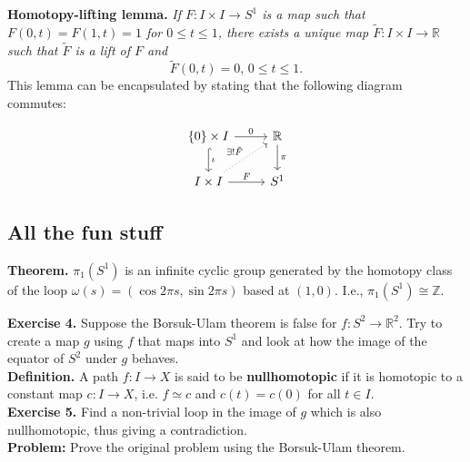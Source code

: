 \documentclass[a4paper]{article}
\theoremstyle{plain}%
\theoremstyle{definition}
\theoremstyle{remark}
\begin{document}
\textbf{Homotopy-lifting lemma.}
    \textit{If $F  \colon I \times I \to S^{1}$ is a map such that
    $F(0,t) = F(1,t) = 1$ for $0 \le t \le 1$, there exists a unique
    map $\tilde{F}  \colon I \times I \to \mathbb{R}$ such that
    $\tilde{F}$ is a lift of $F$ and
    \[
    \tilde{F}(0,t) = 0, \, 0 \le t \le 1.
    \] 
}
This lemma can be encapsulated by stating that the following diagram commutes:

\begin{equation*}
\begin{tikzcd}
    \left\{ 0 \right\} \times I \ar[r, "0"] \ar[d, "\iota", hookrightarrow]
    & \mathbb{R} \ar[d, "\pi"]\\
    I \times I \ar[ru, " \exists ! \tilde{F}", dotted] \ar[r, "F"] & S^{1}
\end{tikzcd}
\end{equation*}




\subsection*{All the fun stuff}

\textbf{Theorem.} $\pi_1 (S^{1})$ is an infinite cyclic group generated by the
homotopy class of the loop $\omega (s) = \left( \cos 2 \pi s, \sin 2 \pi
s \right) $ based at $(1,0)$. I.e., $\pi_1 (S^{1}) \cong \mathbb{Z}$.\\
\linebreak





\textbf{Exercise 4.} 
Suppose the Borsuk-Ulam theorem is false for $f  \colon S^2 \to \mathbb{R}^2$.
Try to create a map $g$ using $f$ that maps into $S^{1}$ and look at how the image
of the equator of $S^2$ under $g$ behaves.\\
    \linebreak
    \textbf{Definition.} A path $f  \colon I \to X$ is said to be
    \textbf{nullhomotopic} if it is homotopic to a constant map
    $c  \colon I \to X$, i.e. $f \simeq c$ and $c(t) = c(0)$ for all $t \in
    I$.\\
    \linebreak
    \textbf{Exercise 5.} Find a non-trivial loop in the image of $g$ which is
    also nullhomotopic, thus giving a contradiction.\\
    \linebreak
\textbf{Problem:} Prove the original problem using the Borsuk-Ulam theorem.\\
\linebreak
\end{document}
